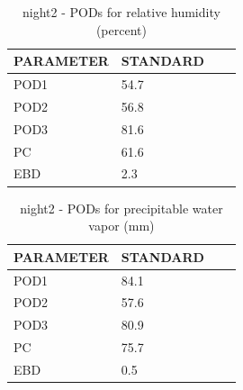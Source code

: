 \begin{table}[p!]
\begin{center}
\begin{tabular}{|l|l|l|l|}
\hline
\multicolumn{1}{|c|}{\cellcolor[HTML]{C0C0C0}\textbf{PARAMETER}} & \multicolumn{1}{c|}{\cellcolor[HTML]{C0C0C0}\textbf{STANDARD}} \\
\hline
\cellcolor[HTML]{C0C0C0}POD1  & 54.7                                \\
\cellcolor[HTML]{C0C0C0}POD2  & 56.8                                \\
\cellcolor[HTML]{C0C0C0}POD3  & 81.6                                \\
\cellcolor[HTML]{C0C0C0}PC    & 61.6                                  \\
\cellcolor[HTML]{C0C0C0}EBD   & 2.3                                 \\
\hline
\end{tabular}
\caption{night2 - PODs for relative humidity (percent)}
\label{tab:podrh:night2}
\end{center}
\end{table}
\begin{table}[p!]
\begin{center}
\begin{tabular}{|l|l|l|l|}
\hline
\multicolumn{1}{|c|}{\cellcolor[HTML]{C0C0C0}\textbf{PARAMETER}} & \multicolumn{1}{c|}{\cellcolor[HTML]{C0C0C0}\textbf{STANDARD}} \\
\hline
\cellcolor[HTML]{C0C0C0}POD1  & 84.1                                \\
\cellcolor[HTML]{C0C0C0}POD2  & 57.6                                \\
\cellcolor[HTML]{C0C0C0}POD3  & 80.9                                \\
\cellcolor[HTML]{C0C0C0}PC    & 75.7                                  \\
\cellcolor[HTML]{C0C0C0}EBD   & 0.5                                 \\
\hline
\end{tabular}
\caption{night2 - PODs for precipitable water vapor (mm)}
\label{tab:podpwv:night2}
\end{center}
\end{table}
